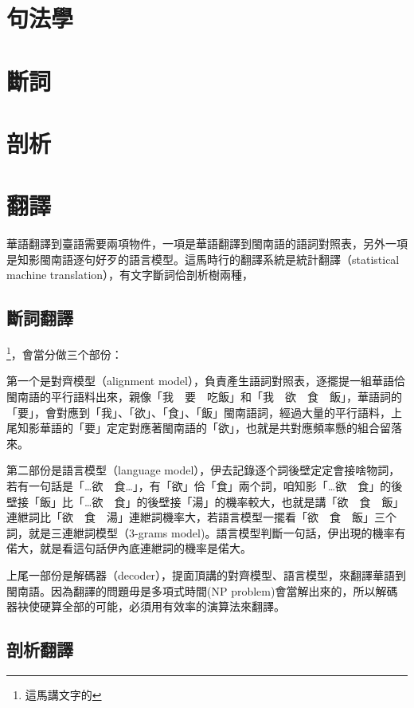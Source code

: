 \documentclass[final,oneside,onecolumn,12pt,a4paper]{book}%
\begin{document}
\section{句法學}
\label{節：句法學}

\section{斷詞}
\label{節：斷詞}

\section{剖析}
\label{節：剖析}

\section{翻譯}
\label{節：翻譯}
華語翻譯到臺語需要兩項物件，一項是華語翻譯到閩南語的語詞對照表，另外一項是知影閩南語逐句好歹的語言模型。這馬時行的翻譯系統是統計翻譯（statistical machine translation），有文字斷詞佮剖析樹兩種，
\subsection{斷詞翻譯}
\label{小節：斷詞翻譯}
\footnote{這馬講文字的}，會當分做三个部份：

第一个是對齊模型（alignment model），負責產生語詞對照表，逐擺提一組華語佮閩南語的平行語料出來，親像「我　要　吃飯」和「我　欲　食　飯」，華語詞的「要」，會對應到「我」、「欲」、「食」、「飯」閩南語詞，經過大量的平行語料，上尾知影華語的「要」定定對應著閩南語的「欲」，也就是共對應頻率懸的組合留落來。

第二部份是語言模型（language model），伊去記錄逐个詞後壁定定會接啥物詞，若有一句話是「…欲　食…」，有「欲」佮「食」兩个詞，咱知影「…欲　食」的後壁接「飯」比「…欲　食」的後壁接「湯」的機率較大，也就是講「欲　食　飯」連紲詞比「欲　食　湯」連紲詞機率大，若語言模型一擺看「欲　食　飯」三个詞，就是三連紲詞模型（3-grams model)。語言模型判斷一句話，伊出現的機率有偌大，就是看這句話伊內底連紲詞的機率是偌大。

上尾一部份是解碼器（decoder），提面頂講的對齊模型、語言模型，來翻譯華語到閩南語。因為翻譯的問題毋是多項式時間(NP problem)會當解出來的，所以解碼器袂使硬算全部的可能，必須用有效率的演算法來翻譯。

\subsection{剖析翻譯}
\label{小節：剖析翻譯}
\end{document}
